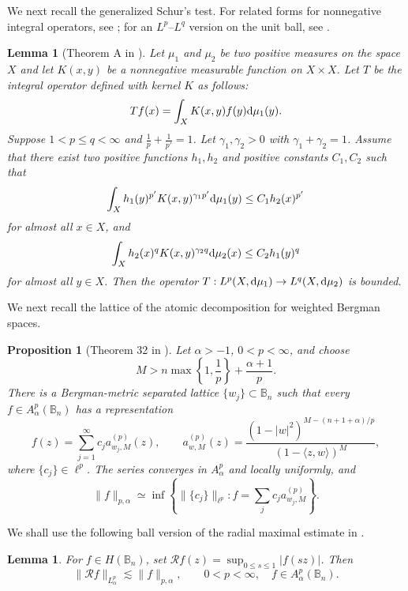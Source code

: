 \documentclass[preprint,12pt,times]{elsarticle}
\newtheorem{lemma}[theorem]{Lemma}
\newtheorem{proposition}[theorem]{Proposition}
\theoremstyle{definition}
\theoremstyle{remark}
\numberwithin{equation}{section}
\begin{document}
We next recall the generalized Schur's test. For related forms for nonnegative
integral operators, see \cite{Okikiolu1970}; for an
$L^p$--$L^q$ version on the unit ball, see \cite{Zhao2015}.

\begin{lemma}[Theorem A in \cite{GSZ2025}]\label{lemma2.3}
Let $\mu_1$ and $\mu_2$ be two positive measures on the space $X$ and let $K(x,y)$ be a nonnegative measurable function on $X\times X$. Let $T$ be the integral operator defined with kernel $K$ as follows:
\[
    Tf(x)=\int_{X}K(x,y)f(y){\rm d}\mu_1(y).
\]
Suppose $1<p\leq q<\infty$ and $\frac{1}{p}+\frac{1}{p'}=1$. Let $\gamma_1, \gamma_2>0$ with $\gamma_1+\gamma_2=1$. Assume that there exist two positive functions $h_1, h_2$ and positive constants $C_1, C_2$ such that
\[
    \int_{X}h_1(y)^{p'}K(x,y)^{\gamma_1 p'}{\rm d}\mu_1(y)\leq C_1h_2(x)^{p'}
\]
for almost all $x\in X$, and 
\[
    \int_{X}h_2(x)^qK(x,y)^{\gamma_2 q}{\rm d}\mu_2(x)\leq C_2h_1(y)^q
\]
for almost all $y\in X$. Then the operator $T: L^p(X,{\rm d}\mu_1)\to L^q(X, {\rm d}\mu_2)$ is bounded.
\end{lemma}

 We next recall the lattice of the atomic decomposition for weighted
Bergman spaces.


\begin{proposition}[Theorem 32 in \cite{ZhaoZhu2008}]\label{proposition2.4}
Let $\alpha>-1$, $0<p<\infty$, and choose
\[
    M>n\max\left\{1,\frac{1}p\right\}+\frac{\alpha+1}{p}.
\]
There is a Bergman-metric separated lattice
$\{w_j\}\subset\mathbb B_n$ such that every $f\in A_\alpha^p(\mathbb B_n)$
has a representation
\begin{equation}\label{atomic-decomposition}
    f(z)=\sum_{j=1}^{\infty}c_j a_{w_j,M}^{(p)}(z),
    \qquad
    a_{w,M}^{(p)}(z)=
    \frac{(1-|w|^2)^{M-(n+1+\alpha)/p}}{(1-\langle z,w\rangle)^M},
    \end{equation}
where $\{c_j\}\in\ell^p$.  The series converges in $A_\alpha^p$ and
locally uniformly, and
\[
    \|f\|_{p,\alpha}\simeq
    \inf\left\{\|\{c_j\}\|_{\ell^p}:
    f=\sum_jc_ja_{w_j,M}^{(p)}\right\}.
\]
\end{proposition}

We shall use the following ball version of the radial maximal estimate in \cite[Theorem~2.1]{AguilarHernandezMasPelaezRattya2026}.
\begin{lemma}\label{lemma2.5}
For $f\in H(\mathbb B_n)$, set
$\mathcal Rf(z)=\sup_{0\leq s\leq1}|f(sz)|$. Then
\begin{equation}\label{equa-radial-maximal}
    \|\mathcal Rf\|_{L_\alpha^p}\lesssim\|f\|_{p,\alpha},
    \qquad 0<p<\infty,\quad f\in A_\alpha^p(\mathbb B_n).
\end{equation}
\end{lemma}
\end{document}
